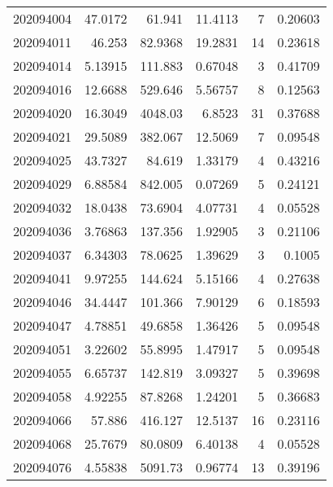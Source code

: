 \begin{tabular}{rrrrrr}
 202094004 &         47.0172  &       61.941  &           11.4113  &           7 & 0.20603 \\
 202094011 &         46.253   &       82.9368 &           19.2831  &          14 & 0.23618 \\
 202094014 &          5.13915 &      111.883  &            0.67048 &           3 & 0.41709 \\
 202094016 &         12.6688  &      529.646  &            5.56757 &           8 & 0.12563 \\
 202094020 &         16.3049  &     4048.03   &            6.8523  &          31 & 0.37688 \\
 202094021 &         29.5089  &      382.067  &           12.5069  &           7 & 0.09548 \\
 202094025 &         43.7327  &       84.619  &            1.33179 &           4 & 0.43216 \\
 202094029 &          6.88584 &      842.005  &            0.07269 &           5 & 0.24121 \\
 202094032 &         18.0438  &       73.6904 &            4.07731 &           4 & 0.05528 \\
 202094036 &          3.76863 &      137.356  &            1.92905 &           3 & 0.21106 \\
 202094037 &          6.34303 &       78.0625 &            1.39629 &           3 & 0.1005  \\
 202094041 &          9.97255 &      144.624  &            5.15166 &           4 & 0.27638 \\
 202094046 &         34.4447  &      101.366  &            7.90129 &           6 & 0.18593 \\
 202094047 &          4.78851 &       49.6858 &            1.36426 &           5 & 0.09548 \\
 202094051 &          3.22602 &       55.8995 &            1.47917 &           5 & 0.09548 \\
 202094055 &          6.65737 &      142.819  &            3.09327 &           5 & 0.39698 \\
 202094058 &          4.92255 &       87.8268 &            1.24201 &           5 & 0.36683 \\
 202094066 &         57.886   &      416.127  &           12.5137  &          16 & 0.23116 \\
 202094068 &         25.7679  &       80.0809 &            6.40138 &           4 & 0.05528 \\
 202094076 &          4.55838 &     5091.73   &            0.96774 &          13 & 0.39196 \\

\end{tabular}
